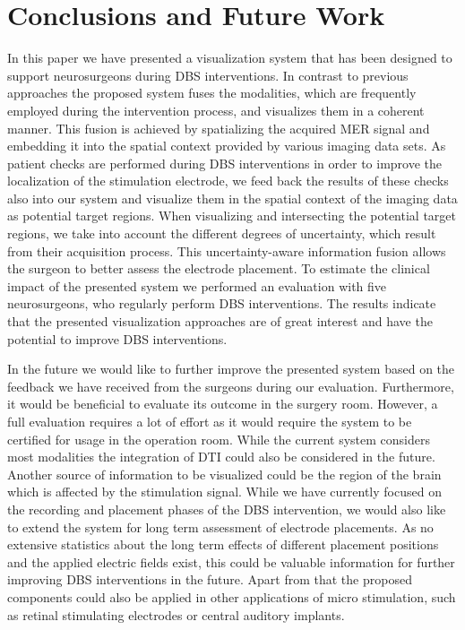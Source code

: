 \documentclass{vgtc}                          %
\begin{document}
\section{Conclusions and Future Work}\label{sec:conclusions}
In this paper we have presented a visualization system that has been designed to support neurosurgeons during DBS interventions. In contrast to previous approaches the proposed system fuses the modalities, which are frequently employed during the intervention process, and visualizes them in a coherent manner. This fusion is achieved by spatializing the acquired MER signal and embedding it into the spatial context provided by various imaging data sets. As patient checks are performed during DBS interventions in order to improve the localization of the stimulation electrode, we feed back the results of these checks also into our system and visualize them in the spatial context of the imaging data as potential target regions. When visualizing and intersecting the potential target regions, we take into account the different degrees of uncertainty, which result from their acquisition process. This uncertainty-aware information fusion allows the surgeon to better assess the electrode placement. To estimate the clinical impact of the presented system we performed an evaluation with five neurosurgeons, who regularly perform DBS interventions. The results indicate that the presented visualization approaches are of great interest and have the potential to improve DBS interventions.

In the future we would like to further improve the presented system based on the feedback we have received from the surgeons during our evaluation. Furthermore, it would be beneficial to evaluate its outcome in the surgery room. However, a full evaluation requires a lot of effort as it would require the system to be certified for usage in the operation room. While the current system considers most modalities the integration of DTI could also be considered in the future. Another source of information to be visualized could be the region of the brain which is affected by the stimulation signal. While we have currently focused on the recording and placement phases of the DBS intervention, we would also like to extend the system for long term assessment of electrode placements. As no extensive statistics about the long term effects of different placement positions and the applied electric fields exist, this could be valuable information for further improving DBS interventions in the future. Apart from that the proposed components could also be applied in other applications of micro stimulation, such as retinal stimulating electrodes or central auditory implants.





\end{document}
